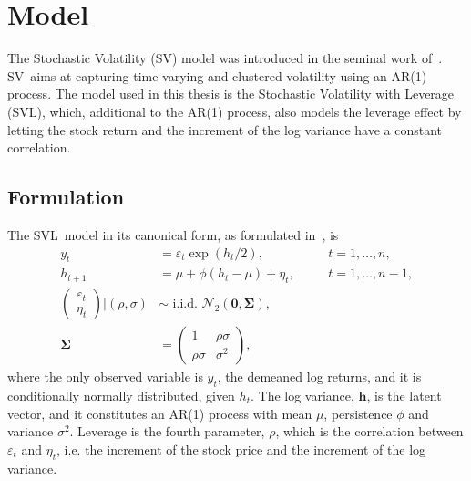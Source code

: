 \newcommand*{\SV}{SV}
\newcommand*{\SVL}{SVL}
\newcommand*{\yts}{y_t^\ast}
\newcommand*{\ets}{\varepsilon_t^\ast}

\section{Model}

The Stochastic Volatility (\SV) model was introduced in the seminal work of~\citet{taylor1982financial}.
\SV~aims at capturing time varying and clustered volatility using an AR(1) process.
The model used in this thesis is the Stochastic Volatility with Leverage (\SVL), which, additional to the AR(1) process, also models the leverage effect by letting the stock return and the increment of the log variance have a constant correlation.

\subsection{Formulation}

The \SVL~model in its canonical form, as formulated in~\citet{Omori2007}, is
\begin{equation}
\begin{alignedat}{2}\label{form:orig_model}
y_t & = \varepsilon_t\exp\left(h_t/2\right), && \quad t=1,\dots,n, \\
h_{t+1} & = \mu+\phi(h_t-\mu)+\eta_t, && \quad t=1,\dots,n-1, \\
\begin{pmatrix}
\varepsilon_t \\
\eta_t
\end{pmatrix}
\bigg\vert\left(\rho,\sigma\right) & \sim\text{ i.i.d. }\mathcal{N}_2\left(\bm{0},\bm{\Sigma}\right), \\
\bm{\Sigma} & =
\begin{pmatrix}
1 & \rho\sigma \\
\rho\sigma & \sigma^2
\end{pmatrix},
\end{alignedat}
\end{equation}
where the only observed variable is $y_t$, the demeaned log returns, and it is conditionally normally distributed, given $h_t$. The log variance, $\bm{h}$, is the latent vector, and it constitutes an AR(1) process with mean $\mu$, persistence $\phi$ and variance $\sigma^2$. Leverage is the fourth parameter, $\rho$, which is the correlation between $\varepsilon_t$ and $\eta_t$, i.e. the increment of the stock price and the increment of the log variance.

